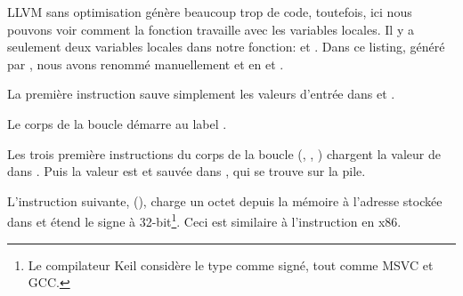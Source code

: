 ﻿

\mysubparagraph{\NonOptimizingXcodeIV (\ARMMode)}



LLVM sans optimisation génère beaucoup trop de code, toutefois, ici nous pouvons
voir comment la fonction travaille avec les variables locales.
Il y a seulement deux variables locales dans notre fonction:  et .
Dans ce listing, généré par \IDA, nous avons renommé manuellement  et
 en  et .

La première instruction sauve simplement les valeurs d'entrée dans  et .

Le corps de la boucle démarre au label .

Les trois première instructions du corps de la boucle (, \ADD, )
chargent la valeur de  dans .
Puis la valeur est  et sauvée dans , qui
se trouve sur la pile.

L'instruction suivante,  (), charge
un octet depuis la mémoire à l'adresse stockée dans  et étend le signe à
32-bit\footnote{Le compilateur Keil considère le type \Tchar comme signé, tout
comme MSVC et GCC.}.
Ceci est similaire à l'instruction \MOVSX en x86.

